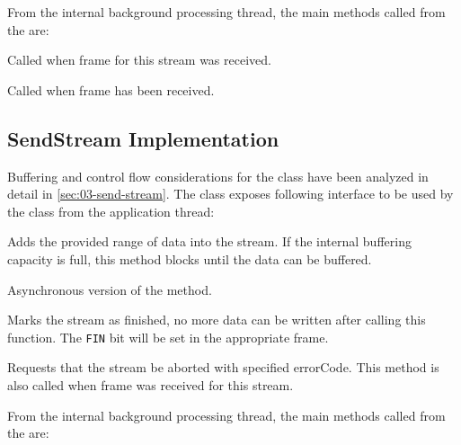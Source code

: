 From the internal background processing thread, the main methods called from the
\ManagedQuicConnection{} are:

\begin{description}

    Called when \RESETSTREAM{} frame for this stream was received.

    Called when \STREAM{} frame has been received.

\end{description}

\subsection{SendStream Implementation}

Buffering and control flow considerations for the \SendStream{} class have been analyzed in detail
in \autoref{sec:03-send-stream}. The \SendStream{} class exposes following interface to be used by
the \ManagedQuicStream{} class from the application thread:

\begin{description}

    Adds the provided range of data into the stream. If the
internal buffering capacity is full, this method blocks until the data can be buffered.

    Asynchronous version of the  method.

    Marks the stream as finished, no more data can be written after calling this function. The
    \texttt{FIN} bit will be set in the appropriate \STREAM{} frame.

    Requests that the stream be aborted with specified errorCode. This method is also called when
    \STOPSENDING{} frame was received for this stream.

\end{description}

From the internal background processing thread, the main methods called from the
\ManagedQuicConnection{} are:

